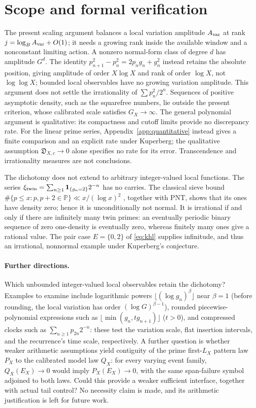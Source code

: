 \documentclass[11pt,a4paper]{article}
\newcommand{\ind}{\mathbf 1}
\begin{document}
\section{Scope and formal verification}\label{sec:scope}

The present scaling argument balances a local variation amplitude
$A_{\rm var}$ at rank $j=\log_B A_{\rm var}+O(1)$; it needs a growing
rank inside the available window and a nonconstant limiting action.
A nonzero normal-form class of degree $d$ has amplitude $G^d$.
The identity $p_{n+1}^2-p_n^2=2p_ng_n+g_n^2$ instead retains the absolute
position, giving amplitude of order $X\log X$ and rank of order
$\log X$, not $\log\log X$; bounded local observables have no growing
variation amplitude.
This argument does not settle the irrationality of $\sum p_n^2/2^n$.
Sequences of positive asymptotic density, such as the squarefree numbers,
lie outside the present criterion, whose calibrated scale satisfies
$G_X\to\infty$.
The general polynomial argument is qualitative: its compactness and
cutoff limits provide no discrepancy rate. For the linear prime series,
Appendix~\ref{app:quantitative} instead gives a finite comparison and an
explicit rate under Kuperberg; the qualitative assumption
$\mathfrak D_{X,c}\to0$ alone specifies no rate for its error.
Transcendence and irrationality measures are not conclusions.

The dichotomy does not extend to arbitrary integer-valued local functions.
The series $\xi_{\rm twin}=\sum_{n\ge1}\ind_{\{g_n=2\}}2^{-n}$ has no carries.
The classical sieve bound
$\#\{p\le x:p,p+2\in\mathbb P\}\ll x/(\log x)^2$
\cite[Theorem~32 and Exercise~34]{taosieve2015}, together with PNT, shows
that its ones have density zero; hence it is unconditionally not normal.
It is irrational if and only if there are infinitely many twin primes:
an eventually periodic binary sequence of zero one-density is eventually
zero, whereas finitely many ones give a rational value.
The pair case $E=\{0,2\}$ of \eqref{eq:khl} supplies infinitude, and thus
an irrational, nonnormal example under Kuperberg's conjecture.

\paragraph{Further directions.}
Which unbounded integer-valued local observables retain the dichotomy?
Examples to examine include logarithmic powers
$\lfloor(\log g_n)^\beta\rfloor$ near $\beta=1$ (before rounding, the
local variation has order $(\log G)^{\beta-1}$), rounded piecewise-polynomial
expressions such as $\lfloor\min(g_n,tg_{n+1})\rfloor$ ($t>0$),
and compressed clocks such as $\sum_{n\ge1}p_{2n}2^{-n}$:
these test the variation scale, flat insertion intervals, and the
recurrence's time scale, respectively.
A further question is whether weaker arithmetic assumptions yield
contiguity of the prime first-$L_X$ pattern law $P_X$ to the calibrated
model law $Q_X$: for every varying event family,
$Q_X(E_X)\to0$ would imply $P_X(E_X)\to0$, with the same
span-failure symbol adjoined to both laws. Could this provide a weaker
sufficient interface, together with actual tail control? No necessity
claim is made, and its arithmetic justification is left for future work.
\end{document}
